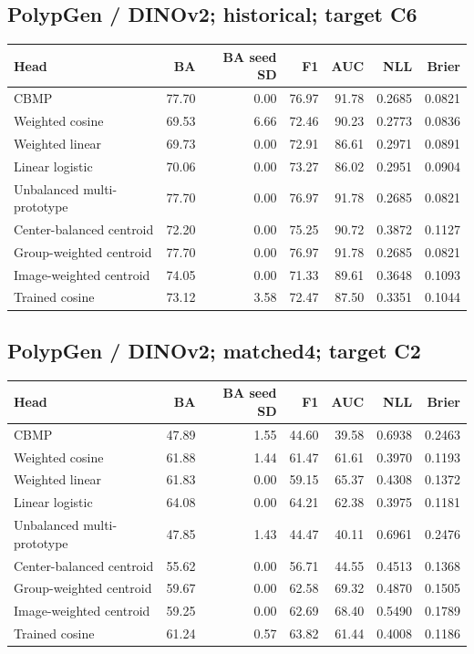 \subsection*{PolypGen / DINOv2; historical; target C6}
\begingroup\small\setlength{\tabcolsep}{3pt}
\begin{longtable}{lrrrrrr}
\toprule Head & BA & BA seed SD & F1 & AUC & NLL & Brier \\
\midrule
CBMP & 77.70 & 0.00 & 76.97 & 91.78 & 0.2685 & 0.0821 \\
Weighted cosine & 69.53 & 6.66 & 72.46 & 90.23 & 0.2773 & 0.0836 \\
Weighted linear & 69.73 & 0.00 & 72.91 & 86.61 & 0.2971 & 0.0891 \\
Linear logistic & 70.06 & 0.00 & 73.27 & 86.02 & 0.2951 & 0.0904 \\
Unbalanced multi-prototype & 77.70 & 0.00 & 76.97 & 91.78 & 0.2685 & 0.0821 \\
Center-balanced centroid & 72.20 & 0.00 & 75.25 & 90.72 & 0.3872 & 0.1127 \\
Group-weighted centroid & 77.70 & 0.00 & 76.97 & 91.78 & 0.2685 & 0.0821 \\
Image-weighted centroid & 74.05 & 0.00 & 71.33 & 89.61 & 0.3648 & 0.1093 \\
Trained cosine & 73.12 & 3.58 & 72.47 & 87.50 & 0.3351 & 0.1044 \\
\bottomrule
\end{longtable}
\endgroup
\subsection*{PolypGen / DINOv2; matched4; target C2}
\begingroup\small\setlength{\tabcolsep}{3pt}
\begin{longtable}{lrrrrrr}
\toprule Head & BA & BA seed SD & F1 & AUC & NLL & Brier \\
\midrule
CBMP & 47.89 & 1.55 & 44.60 & 39.58 & 0.6938 & 0.2463 \\
Weighted cosine & 61.88 & 1.44 & 61.47 & 61.61 & 0.3970 & 0.1193 \\
Weighted linear & 61.83 & 0.00 & 59.15 & 65.37 & 0.4308 & 0.1372 \\
Linear logistic & 64.08 & 0.00 & 64.21 & 62.38 & 0.3975 & 0.1181 \\
Unbalanced multi-prototype & 47.85 & 1.43 & 44.47 & 40.11 & 0.6961 & 0.2476 \\
Center-balanced centroid & 55.62 & 0.00 & 56.71 & 44.55 & 0.4513 & 0.1368 \\
Group-weighted centroid & 59.67 & 0.00 & 62.58 & 69.32 & 0.4870 & 0.1505 \\
Image-weighted centroid & 59.25 & 0.00 & 62.69 & 68.40 & 0.5490 & 0.1789 \\
Trained cosine & 61.24 & 0.57 & 63.82 & 61.44 & 0.4008 & 0.1186 \\
\bottomrule
\end{longtable}
\endgroup
